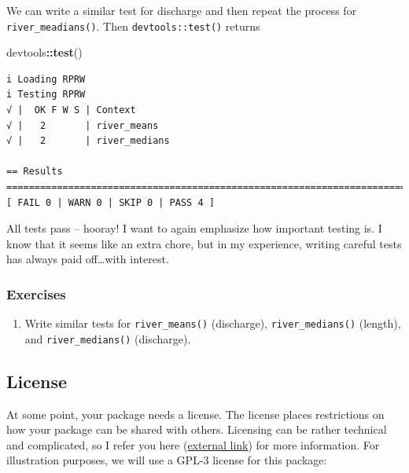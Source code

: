 \documentclass[
]{book}
\newenvironment{Shaded}{\begin{snugshade}}{\end{snugshade}}
\newcommand{\KeywordTok}[1]{\textcolor[rgb]{0.13,0.29,0.53}{\textbf{#1}}}
\newcommand{\NormalTok}[1]{#1}
\newcommand{\OperatorTok}[1]{\textcolor[rgb]{0.81,0.36,0.00}{\textbf{#1}}}
\providecommand{\tightlist}{%
  \setlength{\itemsep}{0pt}\setlength{\parskip}{0pt}}
\begin{document}
We can write a similar test for discharge and then repeat the process for \texttt{river\_meadians()}. Then \texttt{devtools::test()} returns

\begin{Shaded}
\begin{Highlighting}[]
\NormalTok{devtools}\OperatorTok{::}\KeywordTok{test}\NormalTok{()}
\end{Highlighting}
\end{Shaded}

\begin{verbatim}
i Loading RPRW
i Testing RPRW
√ |  OK F W S | Context
√ |   2       | river_means                                                         
√ |   2       | river_medians                                                       

== Results =========================================================================
[ FAIL 0 | WARN 0 | SKIP 0 | PASS 4 ]
\end{verbatim}

All tests pass -- hooray! I want to again emphasize how important testing is. I know that it seems like an extra chore, but in my experience, writing careful tests has always paid off\ldots with interest.

\hypertarget{ex-set4}{%
\subsubsection{Exercises}\label{ex-set4}}

\begin{enumerate}
\def\labelenumi{\arabic{enumi}.}
\tightlist
\item
  Write similar tests for \texttt{river\_means()} (discharge), \texttt{river\_medians()} (length), and \texttt{river\_medians()} (discharge).
\end{enumerate}

\hypertarget{license}{%
\subsection{License}\label{license}}

At some point, your package needs a license. The license places restrictions on how your package can be shared with others. Licensing can be rather technical and complicated, so I refer you here (\href{https://r-pkgs.org/license.html}{external link}) for more information. For illustration purposes, we will use a GPL-3 license for this package:
\end{document}
